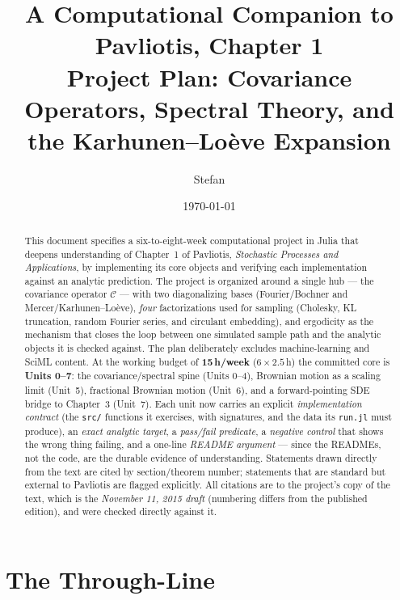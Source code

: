 \documentclass[11pt]{article}
\title{\textbf{A Computational Companion to Pavliotis, Chapter 1}\\[4pt]
\large Project Plan: Covariance Operators, Spectral Theory, and the Karhunen--Lo\`eve Expansion}
\author{Stefan}
\date{\today}
\begin{document}
\maketitle

\begin{abstract}
\noindent This document specifies a six-to-eight-week computational project in Julia that deepens understanding of Chapter~1 of Pavliotis, \emph{Stochastic Processes and Applications}, by implementing its core objects and verifying each implementation against an analytic prediction. The project is organized around a single hub --- the covariance operator $\mathcal{C}$ --- with two diagonalizing bases (Fourier/Bochner and Mercer/Karhunen--Lo\`eve), \emph{four} factorizations used for sampling (Cholesky, KL truncation, random Fourier series, and circulant embedding), and ergodicity as the mechanism that closes the loop between one simulated sample path and the analytic objects it is checked against. The plan deliberately excludes machine-learning and SciML content. At the working budget of \textbf{15\,h/week} ($6\times 2.5$\,h) the committed core is \textbf{Units 0--7}: the covariance/spectral spine (Units 0--4), Brownian motion as a scaling limit (Unit~5), fractional Brownian motion (Unit~6), and a forward-pointing SDE bridge to Chapter~3 (Unit~7). Each unit now carries an explicit \emph{implementation contract} (the \texttt{src/} functions it exercises, with signatures, and the data its \texttt{run.jl} must produce), an \emph{exact analytic target}, a \emph{pass/fail predicate}, a \emph{negative control} that shows the wrong thing failing, and a one-line \emph{README argument} --- since the READMEs, not the code, are the durable evidence of understanding. Statements drawn directly from the text are cited by section/theorem number; statements that are standard but external to Pavliotis are flagged explicitly. All citations are to the project's copy of the text, which is the \emph{November 11, 2015 draft} (numbering differs from the published edition), and were checked directly against it.
\end{abstract}

\tableofcontents

\section{The Through-Line}
\end{document}
